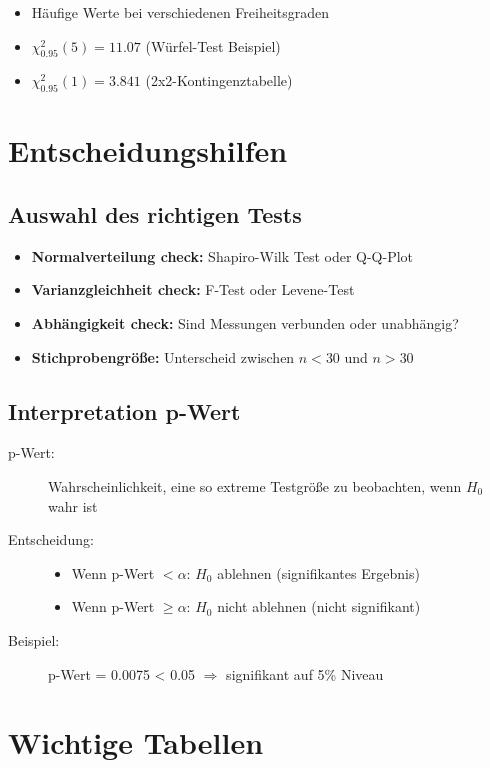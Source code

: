\documentclass[12pt, a4paper, titlepage, ngerman]{scrartcl}
\begin{document}
\begin{itemize}
  \item Häufige Werte bei verschiedenen Freiheitsgraden
  \item $\chi^2_{0.95}(5) = 11.07$ (Würfel-Test Beispiel)
  \item $\chi^2_{0.95}(1) = 3.841$ (2x2-Kontingenztabelle)
\end{itemize}

\section{Entscheidungshilfen}

\subsection{Auswahl des richtigen Tests}

\begin{itemize}
  \item \textbf{Normalverteilung check:} Shapiro-Wilk Test oder Q-Q-Plot
  \item \textbf{Varianzgleichheit check:} F-Test oder Levene-Test
  \item \textbf{Abhängigkeit check:} Sind Messungen verbunden oder unabhängig?
  \item \textbf{Stichprobengröße:} Unterscheid zwischen $n < 30$ und $n > 30$
\end{itemize}

\subsection{Interpretation p-Wert}

\begin{description}
  \item[p-Wert:] Wahrscheinlichkeit, eine so extreme Testgröße zu beobachten, wenn $H_0$ wahr ist
  \item[Entscheidung:] 
    \begin{itemize}
      \item Wenn p-Wert $< \alpha$: $H_0$ ablehnen (signifikantes Ergebnis)
      \item Wenn p-Wert $\geq \alpha$: $H_0$ nicht ablehnen (nicht signifikant)
    \end{itemize}
  \item[Beispiel:] p-Wert = 0.0075 < 0.05 $\Rightarrow$ signifikant auf 5\% Niveau
\end{description}

\section{Wichtige Tabellen}
\end{document}
